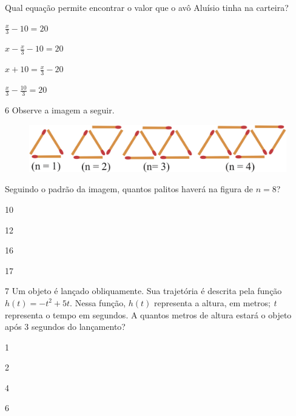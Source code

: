 Qual equação permite encontrar o valor que o avô Aluísio tinha na 
carteira?

\begin{escolha}

\item $\frac{x}{3} - 10 = 20$ 

\item $x - \frac{x}{3} - 10 = 20$ 

\item $x + 10 = \frac{x}{3} - 20$ 

\item $\frac{x}{3} - \frac{10}{3} = 20$ 

\end{escolha}

\pagebreak
\num{6} Observe a imagem a seguir.

\begin{figure}[htpb!]
\centering
\includegraphics[width=\textwidth]{./ilustras-mat/Simulado_1-atividade_6.png}
\end{figure}

Seguindo o padrão da imagem, quantos palitos haverá na figura de $n = 8$?

\begin{multicols}{2}
\begin{escolha}

  \item 10

  \item 12

  \item 16

  \item 17

\end{escolha}
\end{multicols}

\num{7} Um objeto é lançado obliquamente. Sua trajetória é descrita pela
função $h(t) = - t^{2} + 5t$. Nessa função, $h(t)$ representa a altura, em
metros; \textit{t} representa o tempo em segundos. A quantos metros de altura
estará o objeto após 3 segundos do lançamento?

\begin{escolha}

  \item 1

  \item 2

  \item 4

  \item 6

\end{escolha}

